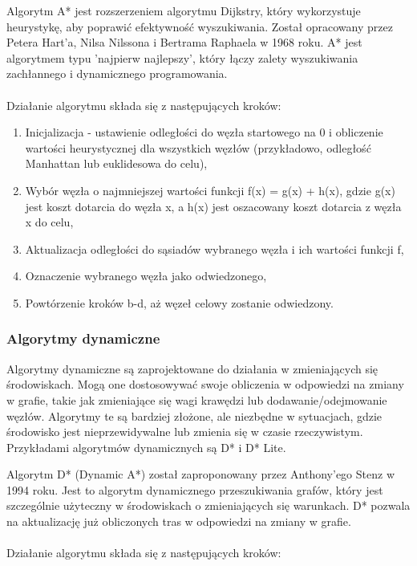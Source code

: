 \documentclass[12pt,twoside]{article}
\begin{document}
Algorytm A* \cite{ASTAR} jest rozszerzeniem algorytmu Dijkstry, który wykorzystuje heurystykę, aby poprawić efektywność wyszukiwania. Został opracowany przez Petera Hart'a, Nilsa Nilssona i Bertrama Raphaela w 1968 roku. A* jest algorytmem typu 'najpierw najlepszy', który łączy zalety wyszukiwania zachłannego i dynamicznego programowania.
\\ \\
Działanie algorytmu składa się z następujących kroków:

\begin{enumerate}[label=\alph*), leftmargin=1.25cm]
	\item Inicjalizacja - ustawienie odległości do węzła startowego na 0 i obliczenie wartości heurystycznej dla wszystkich węzłów (przykładowo, odległość Manhattan lub euklidesowa do celu),
	\item Wybór węzła o najmniejszej wartości funkcji f(x) = g(x) + h(x), gdzie g(x) jest koszt dotarcia do węzła x, a h(x) jest oszacowany koszt dotarcia z węzła x do celu,
	\item Aktualizacja odległości do sąsiadów wybranego węzła i ich wartości funkcji f,
	\item Oznaczenie wybranego węzła jako odwiedzonego,
	\item Powtórzenie kroków b-d, aż węzeł celowy zostanie odwiedzony.
\end{enumerate}

\subsubsection{Algorytmy dynamiczne}

Algorytmy dynamiczne są zaprojektowane do działania w zmieniających się środowiskach. Mogą one dostosowywać swoje obliczenia w odpowiedzi na zmiany w grafie, takie jak zmieniające się wagi krawędzi lub dodawanie/odejmowanie węzłów. Algorytmy te są bardziej złożone, ale niezbędne w sytuacjach, gdzie środowisko jest nieprzewidywalne lub zmienia się w czasie rzeczywistym. Przykładami algorytmów dynamicznych są D* i D* Lite.

Algorytm D* (Dynamic A*) \cite{DSTAR} został zaproponowany przez Anthony'ego Stenz w 1994 roku. Jest to algorytm dynamicznego przeszukiwania grafów, który jest szczególnie użyteczny w środowiskach o zmieniających się warunkach. D* pozwala na aktualizację już obliczonych tras w odpowiedzi na zmiany w grafie.
\\ \\
Działanie algorytmu składa się z następujących kroków:
\end{document}

